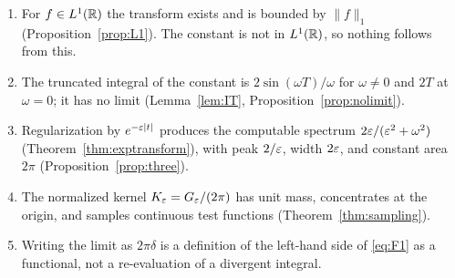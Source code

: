 \begin{enumerate}
\item For $f\in L^{1}(\mathbb{R})$ the transform exists and is bounded by $\|f\|_{1}$
(Proposition~\ref{prop:L1}). The constant is not in $L^{1}(\mathbb{R})$, so nothing follows from this.
\item The truncated integral of the constant is $2\sin(\omega T)/\omega$ for $\omega\neq0$ and
$2T$ at $\omega=0$; it has no limit (Lemma~\ref{lem:IT},
Proposition~\ref{prop:nolimit}).
\item Regularization by $e^{-\varepsilon|t|}$ produces the computable spectrum
$2\varepsilon/(\varepsilon^{2}+\omega^{2})$ (Theorem~\ref{thm:exptransform}), with peak $2/\varepsilon$, width $2\varepsilon$, and
constant area $2\pi$ (Proposition~\ref{prop:three}).
\item The normalized kernel $K_{\varepsilon}=G_{\varepsilon}/(2\pi)$ has unit mass, concentrates at the origin, and
samples continuous test functions (Theorem~\ref{thm:sampling}).
\item Writing the limit as $2\pi\delta$ is a definition of the left-hand side of \eqref{eq:F1} as a
functional, not a re-evaluation of a divergent integral.
\end{enumerate}
